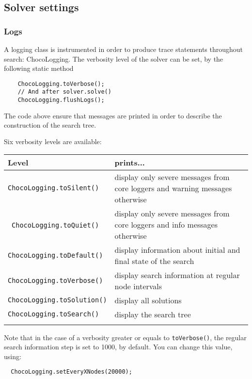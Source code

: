 \subsection{Solver settings}\label{solver:solversettings}\hypertarget{solver:solversettings}{}

\subsubsection{Logs}\label{solver:logs}\hypertarget{solver:logs}{}
A logging class is instrumented in order to produce trace statements throughout search: ChocoLogging. The verbosity level of the solver can be set, by the following static method
\begin{lstlisting}
	ChocoLogging.toVerbose();
	// And after solver.solve()
	ChocoLogging.flushLogs();
\end{lstlisting}

The code above ensure that messages are printed in order to describe the construction of the search tree.

Six verbosity levels are available:

\noindent\begin{tabular}{p{.4\linewidth}p{.6\linewidth}}
  \hline
  Level & prints... \\
  \hline
 \texttt{ChocoLogging.toSilent()} & display only severe messages from core loggers and warning messages otherwise\\
 \ \texttt{ChocoLogging.toQuiet()} & display only severe messages from core loggers and info messages otherwise\\
 \texttt{ChocoLogging.toDefault()} & display information about initial and final state of the search\\
 \texttt{ChocoLogging.toVerbose()} & display search information at regular node intervals\\
 \texttt{ChocoLogging.toSolution()} & display all solutions\\
 \texttt{ChocoLogging.toSearch()} & display the search tree\\
\hline\\
\end{tabular}

Note that in the case of a verbosity greater or equals to \texttt{toVerbose()}, the regular search information step is set to 1000, by default. You can change this value, using:
\begin{lstlisting}
  ChocoLogging.setEveryXNodes(20000);
\end{lstlisting}
 

